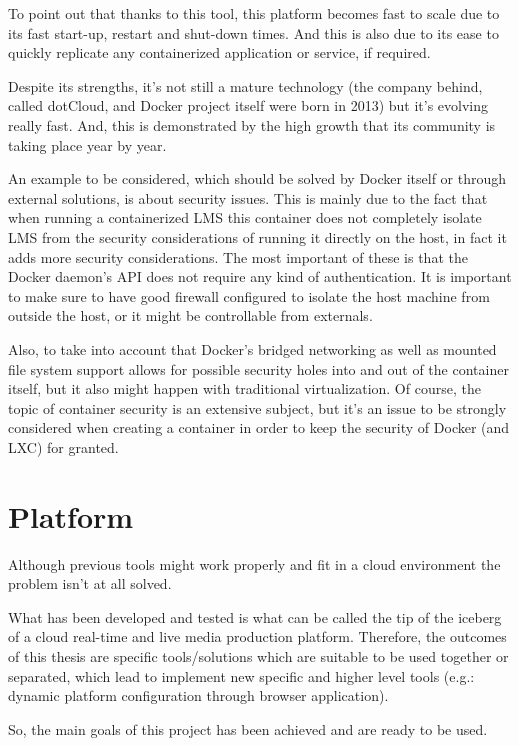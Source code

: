 To point out that thanks to this tool, this platform becomes fast to scale due to its fast start-up, restart and shut-down times. And this is also due to its ease to quickly replicate any containerized application or service, if required. 

Despite its strengths, it's not still a mature technology (the company behind, called dotCloud, and Docker project itself were born in 2013) but it's evolving really fast. And, this is demonstrated by the high growth that its community is taking place year by year. 

An example to be considered, which should be solved by Docker itself or through external solutions, is about security issues. This is mainly due to the fact that when running a containerized LMS this container does not completely isolate LMS from the security considerations of running it directly on the host, in fact it adds more security considerations. The most important of these is that the Docker daemon's API does not require any kind of authentication. It is important to make sure to have good firewall configured to isolate the host machine from outside the host, or it might be controllable from externals. 

Also, to take into account that Docker's bridged networking as well as mounted file system support allows for possible security holes into and out of the container itself, but it also might happen with traditional virtualization. Of course, the topic of container security is an extensive subject, but it's an issue to be strongly considered when creating a container in order to keep the security of Docker (and LXC) for granted.

\section{Platform}

Although previous tools might work properly and fit in a cloud environment the problem isn't at all solved. 

What has been developed and tested is what can be called the tip of the iceberg of a cloud real-time and live media production platform. Therefore, the outcomes of this thesis are specific tools/solutions which are suitable to be used together or separated, which lead to implement new specific and higher level tools (e.g.: dynamic platform configuration through browser application). 

So, the main goals of this project has been achieved and are ready to be used.

